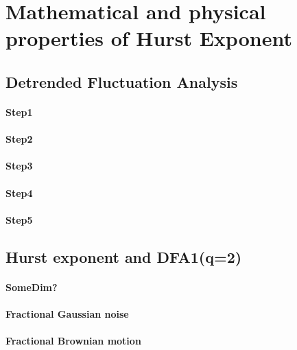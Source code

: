 \section{Mathematical and physical properties of Hurst Exponent} 
\subsection{Detrended Fluctuation Analysis}
\paragraph{Step1}

\paragraph{Step2}
\paragraph{Step3}
\paragraph{Step4}
\paragraph{Step5}
\subsection{Hurst exponent and DFA1(q=2)}
\paragraph{SomeDim?}
\paragraph{Fractional Gaussian noise}
\paragraph{Fractional Brownian motion}